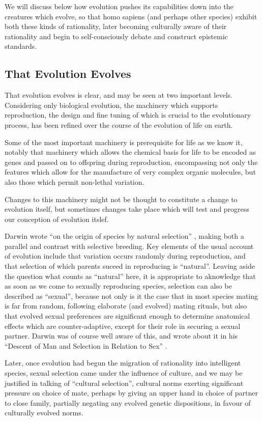 We will discuss below how evolution pushes its capabilities down into the creatures which evolve, so that homo sapiens (and perhaps other species) exhibit both these kinds of rationality, later becoming culturally aware of their rationality and begin to self-consciously debate and construct epistemic standards.

\subsection{That Evolution Evolves}

That evolution evolves is clear, and may be seen at two important levels.
Considering only biological evolution, the machinery which supports reproduction, the design and fine tuning of which is crucial to the evolutionary process, has been refined over the course of the evolution of life on earth.

Some of the most important machinery is prerequisite for life as we know it, notably that machinery which allows the chemical basis for life to be encoded as genes and passed on to offspring during reproduction, encompassing not only the features which allow for the manufacture of very complex organic molecules, but also those which permit non-lethal variation.

Changes to this machinery might not be thought to constitute a change to evolution itself, but sometimes changes take place which will test and progress our conception of evolution itslef.

Darwin wrote ``on the origin of species by natural selection'' \cite{darwin-oos}, making both a parallel and contrast with selective breeding.
Key elements of the usual account of evolution include that variation occurs randomly during reproduction, and that selection of which parents suceed in reproducing is ``natural''.
Leaving aside the question what counts as ``natural'' here, it is appropriate to aknowledge that as soon as we come to sexually reproducing species, selection can also be described as ``sexual'', because not only is it the case that in most species mating is far from random, following elaborate (and evolved) mating rituals, but also that evolved sexual preferences are significant enough to determine anatomical effects which are counter-adaptive, except for their role in securing a sexual partner.
Darwin was of course well aware of this, and wrote about it in his ``Descent of Man and Selection in Relation to Sex'' \cite{darwin1890descent}.

Later, once evolution had begun the migration of rationality into intelligent species, sexual selection came under the influence of culture, and we may be justified in talking of ``cultural selection'', cultural norms exerting significant pressure on choice of mate, perhaps by giving an upper hand in choice of partner to close family, partially negating any evolved genetic dispositions, in favour of culturally evolved norms.

